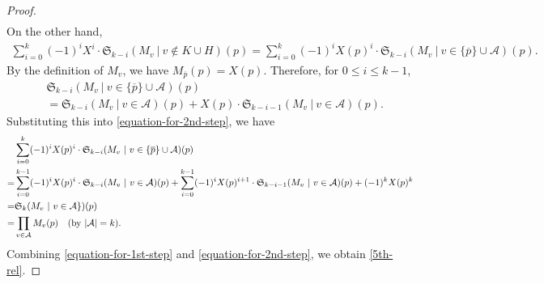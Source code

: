 \documentclass[12pt]{amsart}
\theoremstyle{remark}
\numberwithin{equation}{section}
\begin{document}
\begin{proof}
\begin{align}
\end{align}
On the other hand,
\begin{align}
\label{equation-for-2nd-step}
 \sum_{i=0}^{k}(-1)^{i}X^{i}\cdot \mathfrak{S}_{k-i}(M_{v}\ |\ v\not\in K\cup H)(p)  
=\sum_{i=0}^{k}(-1)^{i}X(p)^{i}\cdot \mathfrak{S}_{k-i}(M_{v}\ |\ v\in \{\overline{p}\}\cup\mathcal{A})(p). %
\end{align}
By the definition of $M_{v}$, %
we have $M_{\overline{p}}(p)=X(p)$.
Therefore, for $0\le i\le k-1$, 
\begin{align*}
& \mathfrak{S}_{k-i}(M_{v}\ |\ v\in \{\overline{p}\}\cup\mathcal{A})(p) \\
&=
\mathfrak{S}_{k-i}(M_{v}\ |\ v\in \mathcal{A})(p)+
X(p)\cdot \mathfrak{S}_{k-i-1}(M_{v}\ |\ v\in \mathcal{A})(p).
\end{align*}
Substituting this into \eqref{equation-for-2nd-step}, we have 
\begin{align*}
& \sum_{i=0}^{k}(-1)^{i}X(p)^{i}\cdot \mathfrak{S}_{k-i}(M_{v}\ |\ v\in \{\overline{p}\}\cup\mathcal{A})(p) \\
=&\sum_{i=0}^{k-1}(-1)^{i}X(p)^{i}\cdot\mathfrak{S}_{k-i}(M_{v}\ |\ v\in \mathcal{A})(p)+
\sum_{i=0}^{k-1}(-1)^{i}X(p)^{i+1}\cdot \mathfrak{S}_{k-i-1}(M_{v}\ |\ v\in \mathcal{A})(p)
+(-1)^{k}X(p)^{k} \\
=&\mathfrak{S}_{k}(M_{v}\ |\ v\in \mathcal{A}\})(p) \\
=&\prod_{v\in \mathcal{A}}M_{v}(p)\quad ({\rm by}\ |\mathcal{A}|=k).
\end{align*}
Combining \eqref{equation-for-1st-step} and \eqref{equation-for-2nd-step}, we obtain \eqref{5th-rel}.
\end{proof}
\end{document}
